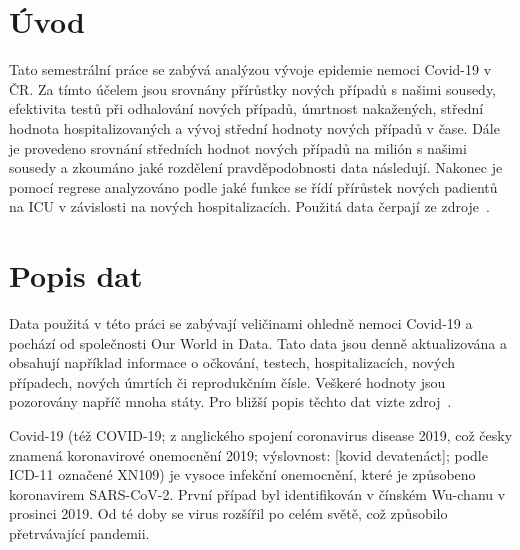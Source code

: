 \documentclass[a4paper, 12pt]{article}
\begin{document}



\titulniStrana
\generujObsah			%
\generujSeznamObrazku		%
\generujSeznamTabulek		%



\clearpage
\pagestyle{plain}		%
 {}
\section*{Úvod}
\label{uvod}

Tato semestrální práce se zabývá analýzou vývoje epidemie nemoci Covid-19 v ČR. Za tímto účelem
jsou srovnány přírůstky nových případů s našimi sousedy, efektivita testů při odhalování nových případů, úmrtnost nakažených, střední hodnota hospitalizovaných a vývoj střední hodnoty nových případů v čase. Dále je provedeno srovnání středních hodnot nových případů na milión s našimi sousedy a zkoumáno jaké rozdělení pravděpodobnosti data následují. Nakonec je pomocí regrese analyzováno
podle jaké funkce se řídí přírůstek nových padientů na ICU v závislosti na nových hospitalizacích. Použitá data čerpají ze zdroje~\cite{1}.






\section{Popis dat}
Data použitá v této práci se zabývají veličinami ohledně nemoci Covid-19 a pochází
od společnosti Our World in Data. Tato data jsou denně aktualizována a obsahují
například informace o očkování, testech, hospitalizacích, nových případech,
nových úmrtích či reprodukčním čísle. Veškeré hodnoty jsou pozorovány napříč
mnoha státy. Pro bližší popis těchto dat vizte zdroj~\cite{1}.

Covid-19 (též COVID-19; z anglického spojení coronavirus disease 2019, což česky znamená koronavirové onemocnění 2019; výslovnost: [kovid devatenáct]; podle ICD-11 označené XN109) je vysoce infekční onemocnění, které je způsobeno koronavirem SARS-CoV-2. První případ byl identifikován v čínském Wu-chanu v prosinci 2019. Od té doby se virus rozšířil po celém světě, což způsobilo přetrvávající pandemii.
\end{document}
